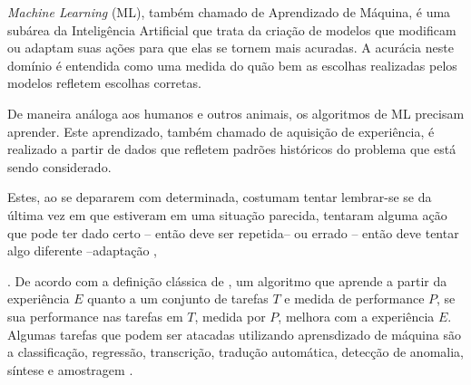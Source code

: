 \emph{Machine Learning} (ML), também chamado de Aprendizado de Máquina, é uma subárea da Inteligência Artificial que trata da criação de modelos que modificam ou adaptam suas ações para que elas se tornem mais acuradas. A acurácia neste domínio é entendida como uma medida do quão bem as escolhas realizadas pelos modelos refletem escolhas corretas. 

De maneira análoga aos humanos e outros animais, os algoritmos de ML precisam aprender. Este aprendizado, também chamado de aquisição de experiência, é realizado a partir de dados que refletem padrões históricos do problema que está sendo considerado.


 Estes, ao se depararem com determinada, costumam tentar lembrar-se se da última vez em que estiveram em uma situação parecida, tentaram alguma ação que pode ter dado certo -- então deve ser repetida-- ou errado -- então deve tentar algo diferente --adaptação \cite{marsland2015machine,goodfellow2016deep},


  \cite{}. De acordo com a definição clássica de \cite{mitchell1997machine}, um algoritmo que aprende a partir da experiência $E$ quanto a um conjunto de tarefas $T$ e medida de performance $P$, se sua performance nas tarefas em $T$, medida por $P$, melhora com a experiência $E$.
Algumas tarefas que podem ser atacadas utilizando aprensdizado de máquina são a classificação, regressão, transcrição, tradução automática, detecção de anomalia, síntese e amostragem \cite{goodfellow2016deep}.

